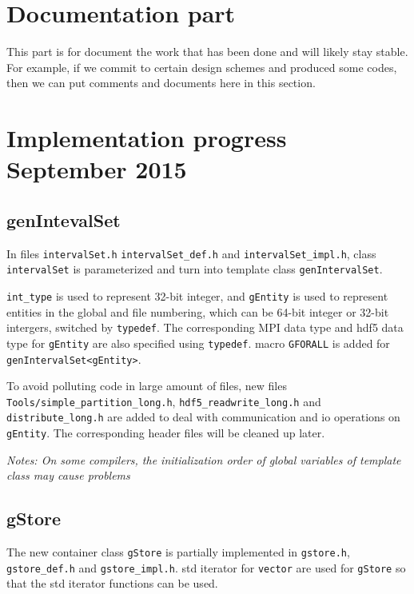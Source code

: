 \documentclass{article}
\begin{document}
% 
\section{Documentation part}
This part is for document the work that has been done and will likely
stay stable.  For example, if we commit to certain design schemes and
produced some codes, then we can put comments and documents here in this
section.

\section{Implementation progress September 2015}
\subsection{genIntevalSet}
In files \texttt{intervalSet.h} \texttt{intervalSet\_def.h} and \texttt{intervalSet\_impl.h},
class \texttt{intervalSet} is parameterized and turn into template class
\texttt{genIntervalSet}. 

\texttt{int\_type} is used to represent 32-bit integer, and \texttt{gEntity} is used to
represent entities in the global and file numbering, which can be
64-bit integer or 32-bit intergers, switched by \texttt{typedef}. The corresponding MPI data type and hdf5
data type for \texttt{gEntity} are also specified using \texttt{typedef}. macro \texttt{GFORALL}
is added for \texttt{genIntervalSet<gEntity>}.

To avoid
polluting code in large amount of files, new files
\texttt{Tools/simple\_partition\_long.h}, \texttt{hdf5\_readwrite\_long.h} and
\texttt{distribute\_long.h} are added to deal with communication and
io operations on 
\texttt{gEntity}. The corresponding header files will be cleaned up later.


{\it Notes: On some compilers, the initialization order of global
  variables of template class may cause problems}
  
\subsection{gStore}
The new container class \texttt{gStore} is partially implemented in \texttt{gstore.h},
\texttt{gstore\_def.h} and \texttt{gstore\_impl.h}. 
std iterator for \texttt{vector} are used for \texttt{gStore} so that the std iterator functions
can be used. 
\end{document}
